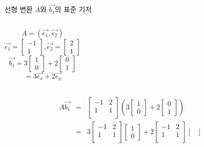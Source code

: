 \documentclass[10pt,t]{beamer}
\begin{document}
\begin{frame}{선형 변환}
    $A$와 $\vec{b_1}$의 표준 기저
    \begin{columns}
        \[A = (\vec{e_1}, \vec{e_2})\]
        \[\vec{e_1}= \begin{bmatrix}
            -1\\
            1
        \end{bmatrix}, \vec{e_2}= \begin{bmatrix}
            2\\
            1
        \end{bmatrix}\]
        \[\vec{b_1} = 3\begin{bmatrix}
            1\\
            0
        \end{bmatrix} + 2\begin{bmatrix}
            0\\
            1
        \end{bmatrix}\]
        \[= 3 \vec{e_x} + 2 \vec{e_y}\]
    \end{columns}
    \pagebreak
    \begin{eqnarray*}
        A\vec{b_1} &=& \begin{bmatrix}
            -1 & 2 \\
            1  & 1\\
        \end{bmatrix} \left( 3\begin{bmatrix}
            1\\
            0
        \end{bmatrix} + 2\begin{bmatrix}
            0\\
            1
        \end{bmatrix}\right) \\
        &=& 3\begin{bmatrix}
            -1 & 2 \\
            1  & 1\\
        \end{bmatrix}\begin{bmatrix}
            1\\
            0
        \end{bmatrix} + 2\begin{bmatrix}
            -1 & 2 \\
            1  & 1\\
        \end{bmatrix}\begin{bmatrix}

\end{bmatrix}
\end{eqnarray*}
\end{frame}
\end{document}
